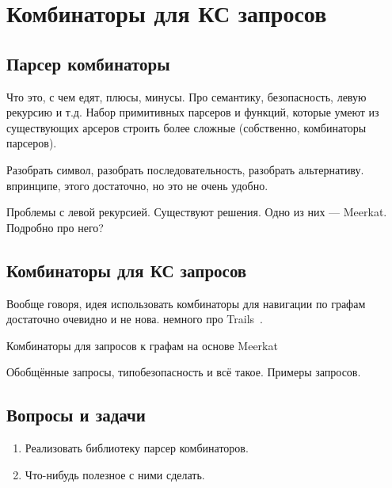 \chapter{Комбинаторы для КС запросов}

\section{Парсер комбинаторы}

Что это, с чем едят, плюсы, минусы. Про семантику, безопасность, левую рекурсию и т.д.
Набор примитивных парсеров и функций, которые умеют из существующих арсеров строить более сложные (собственно, комбинаторы парсеров).

Разобрать символ, разобрать последовательность, разобрать альтернативу. впринципе, этого достаточно, но это не очень удобно.

Проблемы с левой рекурсией.
Существуют решения. Одно из них --- Meerkat.
Подробно про него?

\section{Комбинаторы для КС запросов}

Вообще говоря, идея использовать комбинаторы для навигации по графам достаточно очевидно и не нова.
немного про Trails~\cite{Kroni:2013:PGA:2489837.2489844}.

Комбинаторы для запросов к графам на основе Meerkat~\cite{Verbitskaia:2018:PCC:3241653.3241655}

Обобщённые запросы, типобезопасность и всё такое.
Примеры запросов.

\section{Вопросы и задачи}
\begin{enumerate}
  \item Реализовать библиотеку парсер комбинаторов.
  \item Что-нибудь полезное с ними сделать.
\end{enumerate}
